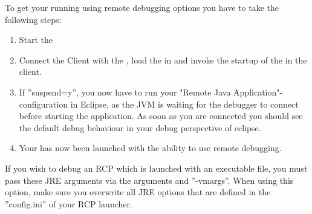 To get your \gdaut{} running using remote debugging options you have to take the following steps:
\begin{enumerate}
 \item Start the \gdserver{}
 \item Connect the Client with the \gdserver{}, load the \gdproject{} in \jb{} and invoke the startup of the \gdaut{} in the \jb{}  client.
 \item If ''suspend=y'', you now have to run your "Remote Java Application"-configuration 
 in Eclipse, as the JVM is waiting for the debugger to connect before starting the 
 application. As soon as you are connected you should see the default debug behaviour in your
 debug perspective of eclipse.
 \item Your \gdaut{} has now been launched with the ability to use remote debugging.  
\end{enumerate}

If you wish to debug an RCP \gdaut{}  which is launched with an 
executable file, you must pass these JRE arguments via the \gdaut{} arguments and ''-vmargs''. When using this option, make sure you overwrite all JRE options that are defined in the ''config.ini'' of your RCP launcher.
